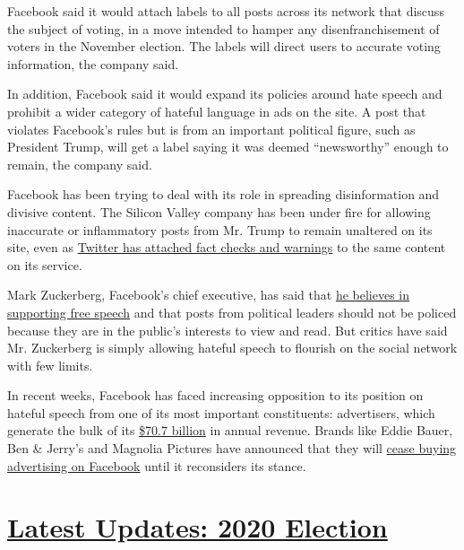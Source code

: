 Facebook said it would attach labels to all posts across its network
that discuss the subject of voting, in a move intended to hamper any
disenfranchisement of voters in the November election. The labels will
direct users to accurate voting information, the company said.

In addition, Facebook said it would expand its policies around hate
speech and prohibit a wider category of hateful language in ads on the
site. A post that violates Facebook's rules but is from an important
political figure, such as President Trump, will get a label saying it
was deemed ``newsworthy'' enough to remain, the company said.

Facebook has been trying to deal with its role in spreading
disinformation and divisive content. The Silicon Valley company has been
under fire for allowing inaccurate or inflammatory posts from Mr. Trump
to remain unaltered on its site, even as
\href{https://www.nytimes3xbfgragh.onion/2020/05/30/technology/twitter-trump-dorsey.html}{Twitter
has attached fact checks and warnings} to the same content on its
service.

Mark Zuckerberg, Facebook's chief executive, has said that
\href{https://www.nytimes3xbfgragh.onion/2019/10/17/business/zuckerberg-facebook-free-speech.html}{he
believes in supporting free speech} and that posts from political
leaders should not be policed because they are in the public's interests
to view and read. But critics have said Mr. Zuckerberg is simply
allowing hateful speech to flourish on the social network with few
limits.

In recent weeks, Facebook has faced increasing opposition to its
position on hateful speech from one of its most important constituents:
advertisers, which generate the bulk of its
\href{https://investor.fb.com/investor-news/press-release-details/2020/Facebook-Reports-Fourth-Quarter-and-Full-Year-2019-Results/default.aspx}{\$70.7
billion} in annual revenue. Brands like Eddie Bauer, Ben \& Jerry's and
Magnolia Pictures have announced that they will
\href{https://www.nytimes3xbfgragh.onion/2020/06/23/business/media/facebook-ad-boycott.html}{cease
buying advertising on Facebook} until it reconsiders its stance.

\hypertarget{latest-updates-2020-election}{%
\section{\texorpdfstring{\href{https://www.nytimes3xbfgragh.onion/2020/07/31/us/elections/biden-vs-trump.html?action=click\&pgtype=Article\&state=default\&region=MAIN_CONTENT_1\&context=storylines_live_updates}{Latest
Updates: 2020
Election}}{Latest Updates: 2020 Election}}\label{latest-updates-2020-election}}

